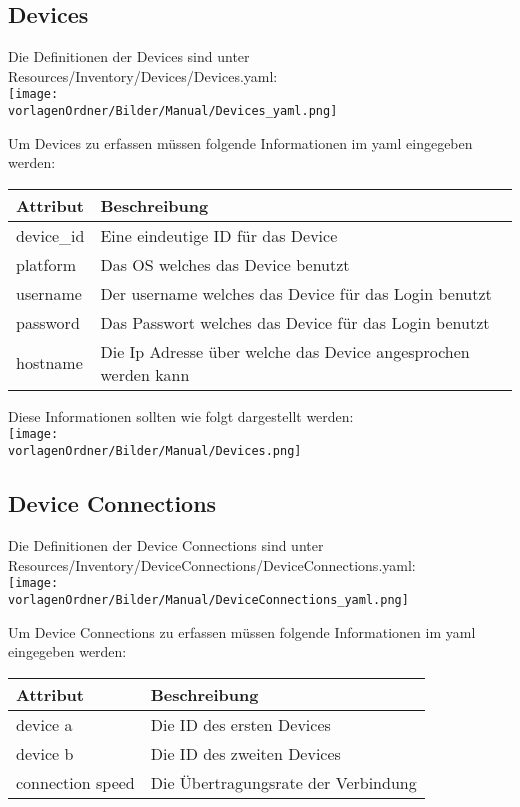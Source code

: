 \documentclass[
	ngerman,
	toc=listof, %
	toc=bibliography, %
	footnotes=multiple, %
	parskip=half, %
	numbers=noendperiod %
]{scrartcl}
\newcommand{\vorlagenOrdner}{../99_Vorlagen} %
\begin{document}
	\subsection{Devices}
		Die Definitionen der Devices sind unter Resources/Inventory/Devices/Devices.yaml:\\
		\texttt{[image: \\vorlagenOrdner/Bilder/Manual/Devices\_yaml.png]}

		Um Devices zu erfassen müssen folgende Informationen im yaml eingegeben werden:\\
		\begin{tabularx}{\textwidth}{ll}
			\toprule
			Attribut & Beschreibung \\
			\midrule
			device\_id & Eine eindeutige ID für das Device \\
			platform & Das OS welches das Device benutzt \\
			username & Der username welches das Device für das Login benutzt\\
			password & Das Passwort welches das Device für das Login benutzt\\
			hostname & Die Ip Adresse über welche das Device angesprochen werden kann\\
			\midrule
		\end{tabularx}

		Diese Informationen sollten wie folgt dargestellt werden: \\
		\texttt{[image: \\vorlagenOrdner/Bilder/Manual/Devices.png]}

	\subsection{Device Connections}
		Die Definitionen der Device Connections sind unter Resources/Inventory/DeviceConnections/DeviceConnections.yaml:\\
		\texttt{[image: \\vorlagenOrdner/Bilder/Manual/DeviceConnections\_yaml.png]}

		Um Device Connections zu erfassen müssen folgende Informationen im yaml eingegeben werden:\\
		\begin{tabularx}{\textwidth}{ll}
			\toprule
			Attribut & Beschreibung \\
			\midrule
			device a & Die ID des ersten Devices \\
			device b & Die ID des zweiten Devices \\
			connection speed & Die Übertragungsrate der Verbindung\\
			\midrule
		\end{tabularx}
\end{document}
